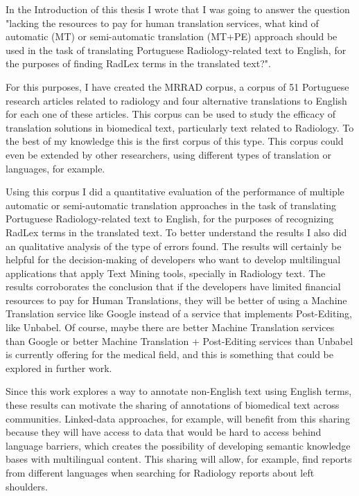 \label{chap5}

In the Introduction of this thesis I wrote that I was going to answer the question "lacking the resources to pay for human translation services, what kind of automatic (MT) or semi-automatic translation (MT+PE) approach should be used in the task of translating Portuguese Radiology-related text to English, for the purposes of finding RadLex terms in the translated text?". 

For this purposes, I have created the MRRAD corpus, a corpus of 51 Portuguese research articles related to radiology and four alternative translations to English for each one of these articles. This corpus can be used to study the efficacy of translation solutions in biomedical text, particularly text related to Radiology. To the best of my knowledge this is the first corpus of this type. This corpus could even be extended by other researchers, using different types of translation or languages, for example. 

Using this corpus I did a quantitative evaluation of the performance of multiple automatic or semi-automatic translation approaches in the task of translating Portuguese Radiology-related text to English, for the purposes of recognizing RadLex terms in the translated text. To better understand the results I also did an qualitative analysis of the type of errors found. The results will certainly be helpful for the decision-making of developers who want to develop multilingual applications that apply Text Mining tools, specially in Radiology text. The results corroborates the conclusion that if the developers have limited financial resources to pay for Human Translations, they will be better of using a Machine Translation service like Google instead of a service that implements Post-Editing, like Unbabel. Of course, maybe there are better Machine Translation services than Google or better Machine Translation + Post-Editing services than Unbabel is currently offering for the medical field, and this is something that could be explored in further work. 

Since this work explores a way to annotate non-English text using English terms, these results can motivate the sharing of annotations of biomedical text across communities. Linked-data \citep{Barros2016} approaches, for example, will benefit from this sharing because they will have access to data that would be hard to access behind language barriers, which creates the possibility of developing semantic knowledge bases \citep{Monteiro2016} with multilingual content. This sharing will allow, for example, find reports from different languages when searching for Radiology reports about left shoulders.

